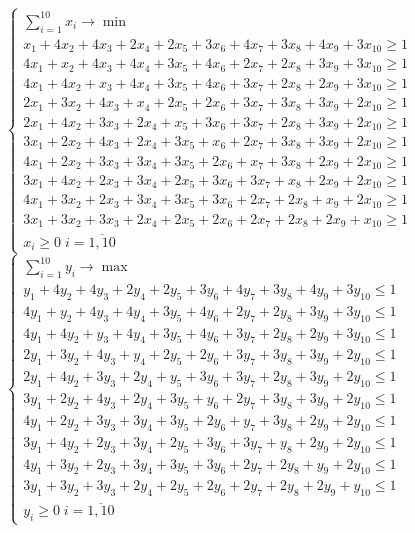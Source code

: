 \documentclass[a4paper,14pt]{extreport}
\begin{document}
$\begin{cases}
\displaystyle\sum_{i=1}^{10}x_i \to \min \\
x_1 + 4x_2 + 4x_3 + 2x_4 + 2x_5 + 3x_6 + 4x_7 + 3x_8 + 4x_9 + 3x_{10} \geq 1 \\
4x_1 + x_2 + 4x_3 + 4x_4 + 3x_5 + 4x_6 + 2x_7 + 2x_8 + 3x_9 + 3x_{10} \geq 1 \\
4x_1 + 4x_2 + x_3 + 4x_4 + 3x_5 + 4x_6 + 3x_7 + 2x_8 + 2x_9 + 3x_{10} \geq 1 \\
2x_1 + 3x_2 + 4x_3 + x_4 + 2x_5 + 2x_6 + 3x_7 + 3x_8 + 3x_9 + 2x_{10} \geq 1 \\
2x_1 + 4x_2 + 3x_3 + 2x_4 + x_5 + 3x_6 + 3x_7 + 2x_8 + 3x_9 + 2x_{10} \geq 1 \\
3x_1 + 2x_2 + 4x_3 + 2x_4 + 3x_5 + x_6 + 2x_7 + 3x_8 + 3x_9 + 2x_{10} \geq 1 \\
4x_1 + 2x_2 + 3x_3 + 3x_4 + 3x_5 + 2x_6 + x_7 + 3x_8 + 2x_9 + 2x_{10} \geq 1 \\
3x_1 + 4x_2 + 2x_3 + 3x_4 + 2x_5 + 3x_6 + 3x_7 + x_8 + 2x_9 + 2x_{10} \geq 1 \\
4x_1 + 3x_2 + 2x_3 + 3x_4 + 3x_5 + 3x_6 + 2x_7 + 2x_8 + x_9 + 2x_{10} \geq 1 \\
3x_1 + 3x_2 + 3x_3 + 2x_4 + 2x_5 + 2x_6 + 2x_7 + 2x_8 + 2x_9 + x_{10} \geq 1 \\
x_i \geq 0\; i=\overline{1, 10}
\end{cases}$\\
$\begin{cases}
\displaystyle\sum_{i=1}^{10}y_i \to \max \\
y_1 + 4y_2 + 4y_3 + 2y_4 + 2y_5 + 3y_6 + 4y_7 + 3y_8 + 4y_9 + 3y_{10} \leq 1 \\
4y_1 + y_2 + 4y_3 + 4y_4 + 3y_5 + 4y_6 + 2y_7 + 2y_8 + 3y_9 + 3y_{10} \leq 1 \\
4y_1 + 4y_2 + y_3 + 4y_4 + 3y_5 + 4y_6 + 3y_7 + 2y_8 + 2y_9 + 3y_{10} \leq 1 \\
2y_1 + 3y_2 + 4y_3 + y_4 + 2y_5 + 2y_6 + 3y_7 + 3y_8 + 3y_9 + 2y_{10} \leq 1 \\
2y_1 + 4y_2 + 3y_3 + 2y_4 + y_5 + 3y_6 + 3y_7 + 2y_8 + 3y_9 + 2y_{10} \leq 1 \\
3y_1 + 2y_2 + 4y_3 + 2y_4 + 3y_5 + y_6 + 2y_7 + 3y_8 + 3y_9 + 2y_{10} \leq 1 \\
4y_1 + 2y_2 + 3y_3 + 3y_4 + 3y_5 + 2y_6 + y_7 + 3y_8 + 2y_9 + 2y_{10} \leq 1 \\
3y_1 + 4y_2 + 2y_3 + 3y_4 + 2y_5 + 3y_6 + 3y_7 + y_8 + 2y_9 + 2y_{10} \leq 1 \\
4y_1 + 3y_2 + 2y_3 + 3y_4 + 3y_5 + 3y_6 + 2y_7 + 2y_8 + y_9 + 2y_{10} \leq 1 \\
3y_1 + 3y_2 + 3y_3 + 2y_4 + 2y_5 + 2y_6 + 2y_7 + 2y_8 + 2y_9 + y_{10} \leq 1 \\
y_i \geq 0\; i=\overline{1, 10}
\end{cases}$\\
\end{document}
